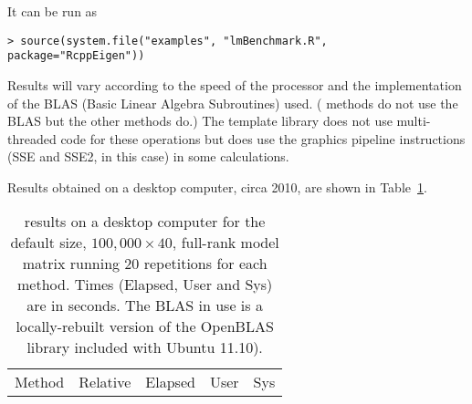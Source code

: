 \documentclass[shortnames,article]{jss}
\begin{document}
It can be run as
\begin{verbatim}
> source(system.file("examples", "lmBenchmark.R", package="RcppEigen"))
\end{verbatim}
Results will vary according to the speed of the processor and the
implementation of the BLAS (Basic Linear Algebra Subroutines) used.
( methods do not use the BLAS but the other methods do.)
The  template library does not use multi-threaded code for
these operations but does use the graphics pipeline instructions (SSE
and SSE2, in this case) in some calculations. 

Results obtained on a desktop computer, circa 2010, are shown in
Table~\ref{tab:lmRes}.
\begin{table}[tb]
  \caption{ results on a desktop computer for the
    default size, $100,000\times 40$, full-rank model matrix running
    20 repetitions for each method.  Times (Elapsed, User and Sys) are
    in seconds.  The BLAS in use is a locally-rebuilt version of the 
    OpenBLAS library included with Ubuntu 11.10).}
  \label{tab:lmRes}
  \centering
  \begin{tabular}{r r r r r}
    \toprule
    \multicolumn{1}{c}{Method} & \multicolumn{1}{c}{Relative} &
    \multicolumn{1}{c}{Elapsed} & \multicolumn{1}{c}{User} &
    \multicolumn{1}{c}{Sys}\\
    \cmidrule(r){2-5}   %

\end{tabular}
\end{table}
\end{document}
